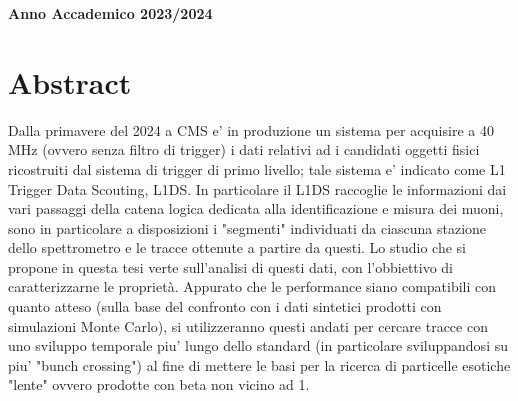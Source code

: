 \documentclass[a4paper,11pt]{book}
\begin{document}
\begin{titlepage}
\begin{center}
{\Large{\bf Anno Accademico 2023/2024}}
\end{center}
\end{titlepage}

\tableofcontents

\chapter*{Abstract}
Dalla primavere del 2024 a CMS e' in produzione un sistema per acquisire a 40 MHz (ovvero senza filtro di trigger) i dati relativi ad i candidati oggetti fisici ricostruiti dal sistema di trigger di primo livello; tale sistema e' indicato come L1 Trigger Data Scouting, L1DS. In particolare il L1DS raccoglie le informazioni dai vari passaggi della catena logica dedicata alla identificazione e misura dei muoni, sono in particolare a disposizioni i "segmenti" individuati da ciascuna stazione dello spettrometro e le tracce ottenute a partire da questi. Lo studio che si propone in questa tesi verte sull'analisi di questi dati, con l'obbiettivo di caratterizzarne le proprietà. Appurato che le performance siano compatibili con quanto atteso (sulla base del confronto con i dati sintetici prodotti con simulazioni Monte Carlo), si utilizzeranno questi andati per cercare tracce con uno sviluppo temporale piu' lungo dello standard (in particolare sviluppandosi su piu' "bunch crossing") al fine di mettere le basi per la ricerca di particelle esotiche "lente" ovvero prodotte con beta
non vicino ad 1.






\appendix
\end{document}
